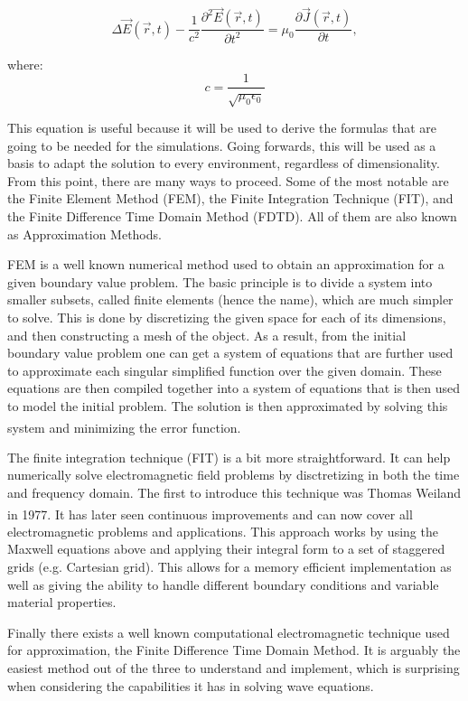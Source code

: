 \begin{equation}
	\label{eqn:waveEquation}
	\Delta\vec{E}(\vec{r},t) - \frac{1}{c^2} \frac{\partial^2 \vec{E}(\vec{r},t)}{\partial t^2} = \mu_{0} \frac{\partial \vec{J}(\vec{r},t)}{\partial t},
\end{equation}

where: $$c = \frac{1}{\sqrt{\mu_{0}\epsilon_{0}}}$$

This equation is useful because it will be used to derive the formulas that are going to be needed for the simulations. Going forwards, this will be used as a basis to adapt the solution to every environment, regardless of dimensionality. From this point, there are many ways to proceed. Some of the most notable are the Finite Element Method (FEM), the Finite Integration Technique (FIT), and the Finite Difference Time Domain Method (FDTD). All of them are also known as Approximation Methods.

FEM is a well known numerical method used to obtain an approximation for a given boundary value problem. The basic principle is to divide a system into smaller subsets, called finite elements (hence the name), which are much simpler to solve. This is done by discretizing the given space for each of its dimensions, and then constructing a mesh of the object. As a result, from the initial boundary value problem one can get a system of equations that are further used to approximate each singular simplified function over the given domain. These equations are then compiled together into a system of equations that is then used to model the initial problem. The solution is then approximated by solving this system and minimizing the error function.\textsuperscript{\cite{logan2011first}}

The finite integration technique (FIT) is a bit more straightforward. It can help numerically solve electromagnetic field problems by disctretizing in both the time and frequency domain. The first to introduce this technique was Thomas Weiland in 1977.\textsuperscript{\cite{weiland1977discretization}} It has later seen continuous improvements and can now cover all electromagnetic problems and applications. This approach works by using the Maxwell equations above and applying their integral form to a set of staggered grids (e.g. Cartesian grid). This allows for a memory efficient implementation as well as giving the ability to handle different boundary conditions and variable material properties.

Finally there exists a well known computational electromagnetic technique used for approximation, the Finite Difference Time Domain Method. It is arguably the easiest method out of the three to understand and implement, which is surprising when considering the capabilities it has in solving wave equations. 

